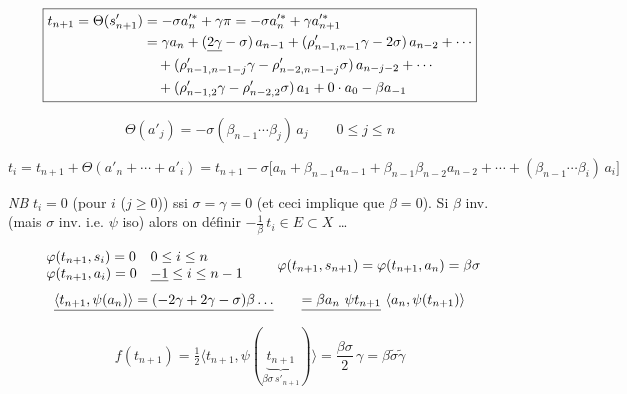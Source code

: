 \documentclass[11pt,a4paper]{article}
\begin{document}
\[
\boxed{
\begin{aligned}
t_{n+1} = \Theta(s'_{n+1}) &= -\sigma a'^{*}_n + \gamma\pi = -\sigma a'^{*}_n + \gamma a'^{*}_{n+1} \\
&= \gamma a_n + (\uncertain{2\gamma} - \sigma)\, a_{n-1} + (\rho'_{n-1,n-1}\gamma - 2\sigma)\, a_{n-2} + \cdots \\
&\quad + (\rho'_{n-1,n-1-j}\gamma - \rho'_{n-2,n-1-j}\sigma)\, a_{n-j-2} + \cdots \\
&\quad + (\rho'_{n-1,2}\gamma - \rho'_{n-2,2}\sigma)\, a_1 + 0 \cdot a_0 - \beta a_{-1}
\end{aligned}}
\]

\[
\boxed{\Theta(a'_j) = -\sigma(\beta_{n-1} \cdots \beta_j)\, a_j \qquad 0 \leq j \leq n}
\]

\[
t_i = t_{n+1} + \Theta(a'_n + \cdots + a'_i)
= t_{n+1} - \sigma \bigl[ a_n + \beta_{n-1} a_{n-1} + \beta_{n-1}\beta_{n-2} a_{n-2} + \cdots + (\beta_{n-1} \cdots \beta_i)\, a_i \bigr]
\]

\emph{NB} $t_i = 0$ (pour  $i$ ($j \geq 0$)) ssi $\sigma = \gamma = 0$
(et ceci implique que $\beta = 0$). Si $\beta$ inv. (mais  $\sigma$ inv. i.e. $\psi$ iso) alors on  définir
$-\frac{1}{\beta}\, t_i \in E \subset X$ \ldots

\[
\begin{array}{ll}
\varphi(t_{n+1}, s_i) = 0 & 0 \leq i \leq n \\
\varphi(t_{n+1}, a_i) = 0 & \uncertain{-1} \leq i \leq n-1
\end{array}
\qquad
\varphi(t_{n+1}, s_{n+1}) = \varphi(t_{n+1}, a_n) = \beta\sigma
\]
\[
\struck{\langle t_{n+1}, \psi(a_n) \rangle = (-2\gamma + 2\gamma - \sigma)\beta \ldots}
\qquad
\struck{= \beta a_n\ \psi t_{n+1}}\ \langle a_n, \psi(t_{n+1}) \rangle
\]
\[
f(t_{n+1}) = \tfrac{1}{2} \langle t_{n+1}, \psi(\underbrace{t_{n+1}}_{\beta\sigma\, s'_{n+1}}) \rangle
= \frac{\beta\sigma}{2}\,\gamma = \beta\tilde{\sigma}\tilde{\gamma}
\]
\end{document}
